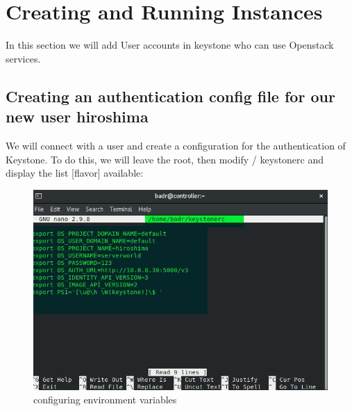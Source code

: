 \chapter{Creating and Running Instances}
\par In this section we will add User accounts in keystone who can use Openstack services.
\begin{spacing}{1.2}
\section{Creating an authentication config file for our new user hiroshima}

\par We will connect with a user and create a configuration for the authentication of
Keystone. To do this, we will leave the root, then modify  / keystonerc and display the list
[flavor] available: 
\\
\begin{figure}[!htb] 
\begin{center} 
\includegraphics[width=1\linewidth]{Cloud/Creating and Running Instances/configuring environment variables} 
\end{center} 
\caption{configuring environment variables} 
\end{figure} 
\FloatBarrier
\\
\begin{figure}[!htb] 
\begin{center} 

\end{center}
\end{figure}
\end{spacing}
